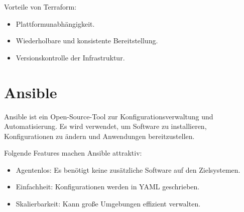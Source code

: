 Vorteile von Terraform:
\begin{itemize}
    \item Plattformunabhängigkeit.
    \item Wiederholbare und konsistente Bereitstellung.
    \item Versionskontrolle der Infrastruktur.
\end{itemize}

\section{Ansible}
Ansible ist ein Open-Source-Tool zur Konfigurationsverwaltung und Automatisierung. Es wird verwendet, um Software zu installieren, Konfigurationen zu ändern und Anwendungen bereitzustellen\cite{AnsibleDocs}.

Folgende Features machen Ansible attraktiv:
\begin{itemize}
    \item Agentenlos: Es benötigt keine zusätzliche Software auf den Zielsystemen.
    \item Einfachheit: Konfigurationen werden in YAML geschrieben.
    \item Skalierbarkeit: Kann große Umgebungen effizient verwalten.
\end{itemize}